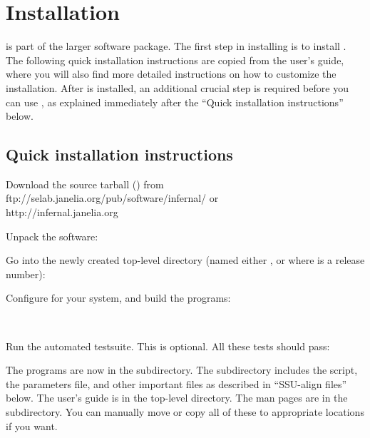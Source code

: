 \section{Installation}
\label{section:install}

 is part of the larger  software
package. The first step in installing  is to install
. The following quick installation instructions are
copied from the  user's guide, where you will also find
more detailed instructions on how to customize the installation. 
After  is installed, an additional crucial step is
required before you can use , as explained immediately
after the ``Quick installation instructions'' below.

\subsection{Quick installation instructions}

Download the source tarball () from 
                  {ftp://selab.janelia.org/pub/software/infernal/}
or \\
                  {http://infernal.janelia.org}

Unpack the software:


Go into the newly created top-level directory (named either
, or  where  is a release
number):


Configure for your system, and build the programs:

\\

Run the automated testsuite. This is optional. All these tests should
pass:


The  programs are now in the 
subdirectory. The  subdirectory includes the
  script, the 
parameters file, and other important files as described in ``SSU-align
files'' below.  The  user's guide is in the top-level
 directory. The man pages are in the
 subdirectory. You can manually move or
copy all of these to appropriate locations if you want.

